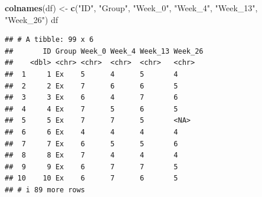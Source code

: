 \documentclass[
]{book}
\newenvironment{Shaded}{\begin{snugshade}}{\end{snugshade}}
\newcommand{\FunctionTok}[1]{\textcolor[rgb]{0.13,0.29,0.53}{\textbf{#1}}}
\newcommand{\NormalTok}[1]{#1}
\newcommand{\OtherTok}[1]{\textcolor[rgb]{0.56,0.35,0.01}{#1}}
\newcommand{\StringTok}[1]{\textcolor[rgb]{0.31,0.60,0.02}{#1}}
\begin{document}
\begin{Shaded}
\begin{Highlighting}[]
\FunctionTok{colnames}\NormalTok{(df) }\OtherTok{\textless{}{-}} \FunctionTok{c}\NormalTok{(}\StringTok{"ID"}\NormalTok{, }\StringTok{"Group"}\NormalTok{, }\StringTok{"Week\_0"}\NormalTok{, }
                \StringTok{"Week\_4"}\NormalTok{, }\StringTok{"Week\_13"}\NormalTok{, }\StringTok{"Week\_26"}\NormalTok{)}
\NormalTok{df}
\end{Highlighting}
\end{Shaded}

\begin{verbatim}
## # A tibble: 99 x 6
##       ID Group Week_0 Week_4 Week_13 Week_26
##    <dbl> <chr> <chr>  <chr>  <chr>   <chr>  
##  1     1 Ex    5      4      5       4      
##  2     2 Ex    7      6      6       5      
##  3     3 Ex    6      4      7       6      
##  4     4 Ex    7      5      6       5      
##  5     5 Ex    7      7      5       <NA>   
##  6     6 Ex    4      4      4       4      
##  7     7 Ex    6      5      5       6      
##  8     8 Ex    7      4      4       4      
##  9     9 Ex    6      7      7       5      
## 10    10 Ex    6      7      6       5      
## # i 89 more rows
\end{verbatim}
\end{document}
